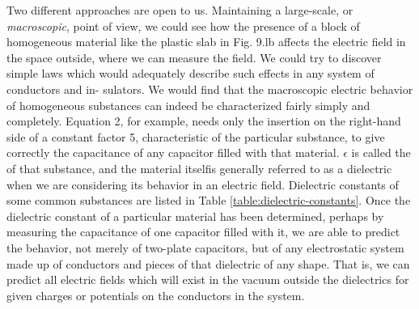 Two different approaches are open to us. Maintaining a large-scale,
or \emph{macroscopic}, point of view, we could see how the presence
of a block of homogeneous material like the plastic slab in Fig. 9.lb
affects the electric field in the space outside, where we can measure
the field. We could try to discover simple laws which would adequately
describe such effects in any system of conductors and in-
sulators. We would find that the macroscopic electric behavior of
homogeneous substances can indeed be characterized fairly simply
and completely. Equation 2, for example, needs only the insertion
on the right-hand side of a constant factor 5, characteristic of the particular
substance, to give correctly the capacitance of any capacitor
filled with that material. $\epsilon$ is called the  of that
substance, and the material itselfis generally referred to as a dielectric
when we are considering its behavior in an electric field. Dielectric
constants of some common substances are listed in Table \ref{table:dielectric-constants}. Once
the dielectric constant of a particular material has been determined,
perhaps by measuring the capacitance of one capacitor filled with it,
we are able to predict the behavior, not merely of two-plate 
capacitors, but of any electrostatic system made up of conductors and
pieces of that dielectric of any shape. That is, we can predict all
electric fields which will exist in the vacuum outside the dielectrics
for given charges or potentials on the conductors in the system.

